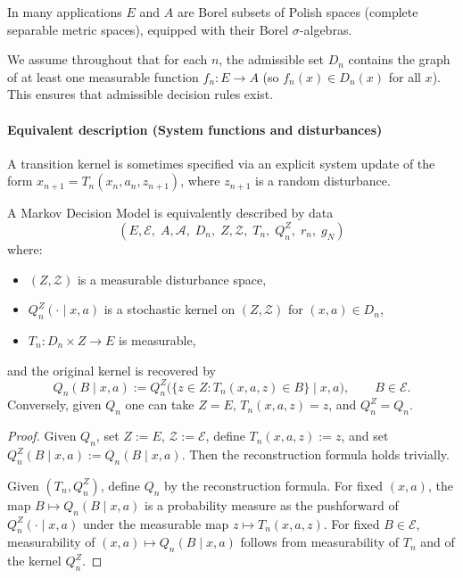 \begin{remark}
In many applications $E$ and $A$ are Borel subsets of Polish spaces (complete separable metric spaces), equipped with their Borel $\sigma$-algebras.
\end{remark}

\begin{remark}
We assume throughout that for each $n$, the admissible set $D_n$ contains the graph of at least one measurable function $f_n:E\to A$ (so $f_n(x)\in D_n(x)$ for all $x$). This ensures that admissible decision rules exist.
\end{remark}

\paragraph{Equivalent description (System functions and disturbances)}

A transition kernel is sometimes specified via an explicit system update of the form
\(
x_{n+1}=T_n(x_n,a_n,z_{n+1})
\),
where $z_{n+1}$ is a random disturbance.

\begin{theorem}
A Markov Decision Model is equivalently described by data
\[
(E,\mathcal{E},\; A,\mathcal{A},\; D_n,\; Z,\mathcal{Z},\; T_n,\; Q_n^Z,\; r_n,\; g_N)
\]
where:
\begin{itemize}[leftmargin=*]
  \item $(Z,\mathcal{Z})$ is a measurable disturbance space,
  \item $Q_n^Z(\cdot\mid x,a)$ is a stochastic kernel on $(Z,\mathcal{Z})$ for $(x,a)\in D_n$,
  \item $T_n:D_n\times Z\to E$ is measurable,
\end{itemize}
and the original kernel is recovered by
\[
Q_n(B\mid x,a) := Q_n^Z\big(\{z\in Z: T_n(x,a,z)\in B\}\mid x,a\big),\qquad B\in\mathcal{E}.
\]
Conversely, given $Q_n$ one can take $Z=E$, $T_n(x,a,z)=z$, and $Q_n^Z=Q_n$.
\end{theorem}

\begin{proof}
Given $Q_n$, set $Z:=E$, $\mathcal{Z}:=\mathcal{E}$, define $T_n(x,a,z):=z$, and set $Q_n^Z(B\mid x,a):=Q_n(B\mid x,a)$.
Then the reconstruction formula holds trivially.

Given $(T_n,Q_n^Z)$, define $Q_n$ by the reconstruction formula.
For fixed $(x,a)$, the map $B\mapsto Q_n(B\mid x,a)$ is a probability measure as the pushforward of $Q_n^Z(\cdot\mid x,a)$ under the measurable map $z\mapsto T_n(x,a,z)$.
For fixed $B\in\mathcal{E}$, measurability of $(x,a)\mapsto Q_n(B\mid x,a)$ follows from measurability of $T_n$ and of the kernel $Q_n^Z$.
\end{proof}

